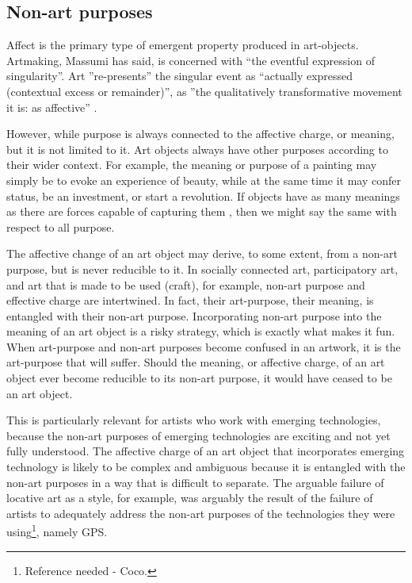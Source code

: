 \documentclass[letterpaper]{article}
\begin{document}
    \subsection{Non-art purposes}

    Affect is the primary type of emergent property produced in art-objects. Artmaking, Massumi has said, is concerned with “the eventful expression of singularity”. Art ”re-presents” the singular event as “actually expressed (contextual excess or remainder)”, as ”the qualitatively transformative movement it is: as affective” \citep[p.252]{MassumiPrblsFrThVrtl2002}.
    
    However, while purpose is always connected to the affective charge, or meaning, but it is not limited to it. Art objects always have other purposes according to their wider context. For example, the meaning or purpose of a painting may simply be to evoke an experience of beauty, while at the same time it may confer status, be an investment, or start a revolution. If objects have as many meanings as there are forces capable of capturing them \citep[p.4]{DeleuzeNtschAndPhlsphy2006}, then we might say the same with respect to all purpose.

    The affective change of an art object may derive, to some extent, from a non-art purpose, but is never reducible to it. In socially connected art, participatory art, and art that is made to be used (craft), for example, non-art purpose and effective charge are intertwined. In fact, their art-purpose, their meaning, is entangled with their non-art purpose. Incorporating non-art purpose into the meaning of an art object is a risky strategy, which is exactly what makes it fun. When art-purpose and non-art purposes become confused in an artwork, it is the art-purpose that will suffer. Should the meaning, or affective charge, of an art object ever become reducible to its non-art purpose, it would have ceased to be an art object.
    
    This is particularly relevant for artists who work with emerging technologies, because the non-art purposes of emerging technologies are exciting and not yet fully understood. The affective charge of an art object that incorporates emerging technology is likely to be complex and ambiguous because it is entangled with the non-art purposes in a way that is difficult to separate. The arguable failure of locative art as a style, for example, was arguably the result of the failure of artists to adequately address the non-art purposes of the technologies they were using\footnote{
        Reference needed - Coco.
    }, namely GPS.
\end{document}
